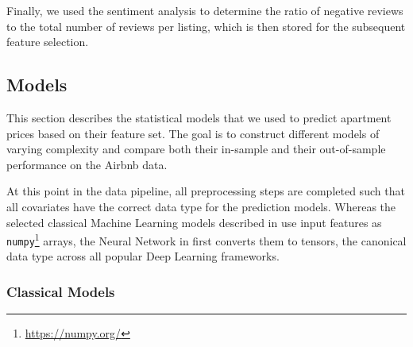 Finally, we used the sentiment analysis to determine the ratio of negative reviews to the total number of reviews per listing, which is then stored for the subsequent feature selection.


\subsection{Models}

This section describes the statistical models that we used to predict apartment prices based on their feature set.
The goal is to construct different models of varying complexity and compare both their in-sample and their out-of-sample performance on the Airbnb data.

At this point in the data pipeline, all preprocessing steps are completed such that all covariates have the correct data type for the prediction models.
Whereas the selected classical Machine Learning models described in  use input features as \texttt{numpy}\footnote{\url{https://numpy.org/}} arrays, the Neural Network in  first converts them to tensors, the canonical data type across all popular Deep Learning frameworks.

\subsubsection{Classical Models} \label{classical-models}

